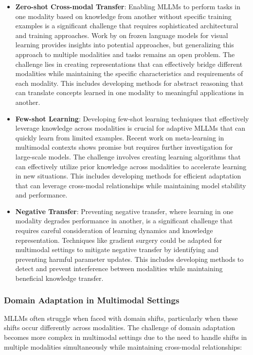 \begin{itemize}
    \item \textbf{Zero-shot Cross-modal Transfer}: Enabling MLLMs to perform tasks in one modality based on knowledge from another without specific training examples is a significant challenge that requires sophisticated architectural and training approaches. Work by \citet{tsimpoukelli2021multimodal} on frozen language models for visual learning provides insights into potential approaches, but generalizing this approach to multiple modalities and tasks remains an open problem. The challenge lies in creating representations that can effectively bridge different modalities while maintaining the specific characteristics and requirements of each modality. This includes developing methods for abstract reasoning that can translate concepts learned in one modality to meaningful applications in another.
    
    \item \textbf{Few-shot Learning}: Developing few-shot learning techniques that effectively leverage knowledge across modalities is crucial for adaptive MLLMs that can quickly learn from limited examples. Recent work on meta-learning in multimodal contexts \citep{pahde2021multimodal} shows promise but requires further investigation for large-scale models. The challenge involves creating learning algorithms that can effectively utilize prior knowledge across modalities to accelerate learning in new situations. This includes developing methods for efficient adaptation that can leverage cross-modal relationships while maintaining model stability and performance.
    
    \item \textbf{Negative Transfer}: Preventing negative transfer, where learning in one modality degrades performance in another, is a significant challenge that requires careful consideration of learning dynamics and knowledge representation. Techniques like gradient surgery \citep{yu2020gradient} could be adapted for multimodal settings to mitigate negative transfer by identifying and preventing harmful parameter updates. This includes developing methods to detect and prevent interference between modalities while maintaining beneficial knowledge transfer.
\end{itemize}

\subsubsection{Domain Adaptation in Multimodal Settings}
MLLMs often struggle when faced with domain shifts, particularly when these shifts occur differently across modalities. The challenge of domain adaptation becomes more complex in multimodal settings due to the need to handle shifts in multiple modalities simultaneously while maintaining cross-modal relationships:

